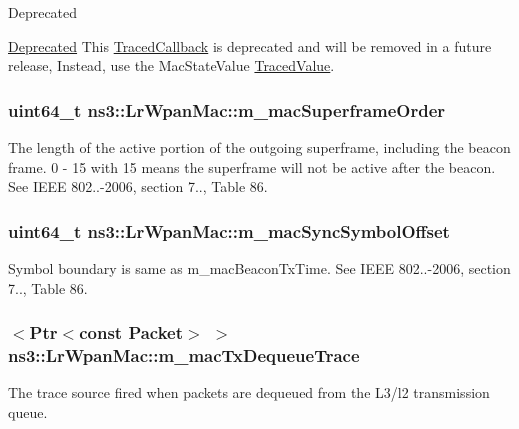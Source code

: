 \begin{DoxyRefDesc}{Deprecated}
\item[\hyperlink{deprecated__deprecated000017}{Deprecated}]This \hyperlink{classns3_1_1TracedCallback}{Traced\+Callback} is deprecated and will be removed in a future release, Instead, use the {\ttfamily Mac\+State\+Value} \hyperlink{classns3_1_1TracedValue}{Traced\+Value}. \end{DoxyRefDesc}
\subsubsection[{\texorpdfstring{m\+\_\+mac\+Superframe\+Order}{m_macSuperframeOrder}}]{\setlength{\rightskip}{0pt plus 5cm}uint64\+\_\+t ns3\+::\+Lr\+Wpan\+Mac\+::m\+\_\+mac\+Superframe\+Order}\hypertarget{classns3_1_1LrWpanMac_ad4c7797599a4e04268e8d8cd16046769}{}\label{classns3_1_1LrWpanMac_ad4c7797599a4e04268e8d8cd16046769}
The length of the active portion of the outgoing superframe, including the beacon frame. 0 -\/ 15 with 15 means the superframe will not be active after the beacon. See I\+E\+EE 802..-\/2006, section 7.., Table 86. 
\subsubsection[{\texorpdfstring{m\+\_\+mac\+Sync\+Symbol\+Offset}{m_macSyncSymbolOffset}}]{\setlength{\rightskip}{0pt plus 5cm}uint64\+\_\+t ns3\+::\+Lr\+Wpan\+Mac\+::m\+\_\+mac\+Sync\+Symbol\+Offset}\hypertarget{classns3_1_1LrWpanMac_ae7628f67a7f4caa970097b915ed3c8e3}{}\label{classns3_1_1LrWpanMac_ae7628f67a7f4caa970097b915ed3c8e3}
Symbol boundary is same as m\+\_\+mac\+Beacon\+Tx\+Time. See I\+E\+EE 802..-\/2006, section 7.., Table 86. 
\subsubsection[{\texorpdfstring{m\+\_\+mac\+Tx\+Dequeue\+Trace}{m_macTxDequeueTrace}}]{$<${\bf Ptr}$<$const {\bf Packet}$>$ $>$ ns3\+::\+Lr\+Wpan\+Mac\+::m\+\_\+mac\+Tx\+Dequeue\+Trace\hspace{0.3cm}{\ttfamily [private]}}\hypertarget{classns3_1_1LrWpanMac_ac59ab298ffb0b3608f5813dd237982db}{}\label{classns3_1_1LrWpanMac_ac59ab298ffb0b3608f5813dd237982db}
The trace source fired when packets are dequeued from the L3/l2 transmission queue.

